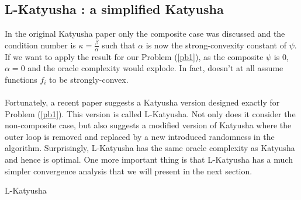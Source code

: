 \documentclass[12pt]{report}
\begin{document}
\subsection{L-Katyusha : a simplified Katyusha}
In the original Katyusha paper \cite{allen2017katyusha} only the composite case was discussed and the condition number is $\kappa=\frac{\beta}{\alpha}$ such that $\alpha$ is now the strong-convexity constant of $\psi$. If we want to apply the result for our Problem (\ref{pb1}), as the composite $\psi$ is $0$, $\alpha=0$ and the oracle complexity would explode. In fact, \cite{allen2017katyusha} doesn't at all assume functions $f_i$ to be strongly-convex.\\ \\ Fortunately, a recent paper \cite{kovalev2019don} suggests a Katyusha version designed exactly for Problem (\ref{pb1}). This version is called L-Katyusha. Not only does it consider the non-composite case, but also suggests a modified version of Katyusha where the outer loop is removed and replaced by a new introduced randomness in the algorithm. Surprisingly, L-Katyusha has the same oracle complexity as Katyusha and hence is optimal. One more important thing is that L-Katyusha has a much simpler convergence analysis that we will present in the next section.
\begin{algorithm}
    \Input{ $\theta_1,\theta_2\geq0$, probability $p\in(0,1]$, 
    initialize $y_0=w_0=z_0\in\mathbb{R}^d$, stepsize $\eta=\frac{\theta_2}{(1+\theta_2)\theta_1}$}
    \caption{L-Katyusha}
\end{algorithm}
\end{document}
